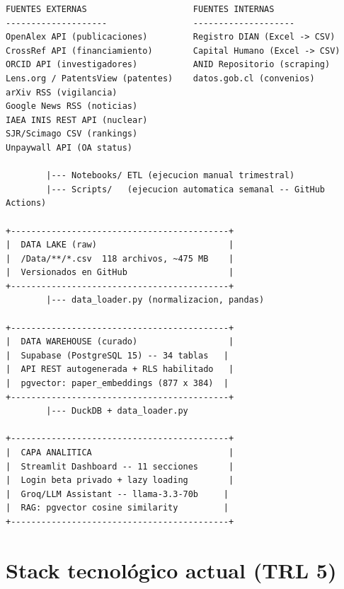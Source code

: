 \documentclass[12pt,a4paper]{report}
\begin{document}
\begin{lstlisting}[caption={Flujo de datos del sistema}, style=bashstyle]
FUENTES EXTERNAS                     FUENTES INTERNAS
--------------------                 --------------------
OpenAlex API (publicaciones)         Registro DIAN (Excel -> CSV)
CrossRef API (financiamiento)        Capital Humano (Excel -> CSV)
ORCID API (investigadores)           ANID Repositorio (scraping)
Lens.org / PatentsView (patentes)    datos.gob.cl (convenios)
arXiv RSS (vigilancia)
Google News RSS (noticias)
IAEA INIS REST API (nuclear)
SJR/Scimago CSV (rankings)
Unpaywall API (OA status)

        |--- Notebooks/ ETL (ejecucion manual trimestral)
        |--- Scripts/   (ejecucion automatica semanal -- GitHub Actions)

+-------------------------------------------+
|  DATA LAKE (raw)                          |
|  /Data/**/*.csv  118 archivos, ~475 MB    |
|  Versionados en GitHub                    |
+-------------------------------------------+
        |--- data_loader.py (normalizacion, pandas)

+-------------------------------------------+
|  DATA WAREHOUSE (curado)                  |
|  Supabase (PostgreSQL 15) -- 34 tablas   |
|  API REST autogenerada + RLS habilitado   |
|  pgvector: paper_embeddings (877 x 384)  |
+-------------------------------------------+
        |--- DuckDB + data_loader.py

+-------------------------------------------+
|  CAPA ANALITICA                           |
|  Streamlit Dashboard -- 11 secciones      |
|  Login beta privado + lazy loading        |
|  Groq/LLM Assistant -- llama-3.3-70b     |
|  RAG: pgvector cosine similarity         |
+-------------------------------------------+
\end{lstlisting}

\section{Stack tecnológico actual (TRL 5)}
\end{document}

